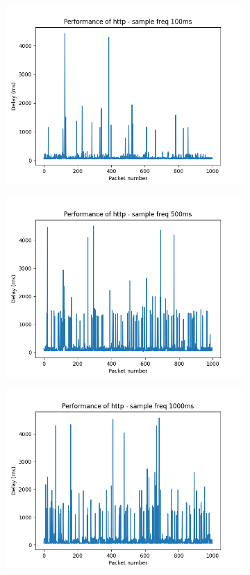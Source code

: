 \documentclass[]{article}
\begin{document}
\begin{figure}[h]
	\begin{subfigure}{0.5\textwidth}
		\includegraphics[width=0.9 \linewidth]{../performance_eval/protocols/fig/http_100ms}
		\caption{}
		\label{fig:http100ms}
	\end{subfigure}
	\begin{subfigure}{0.5\textwidth}
		\includegraphics[width=0.9\linewidth]{../performance_eval/protocols/fig/http_500ms}
		\caption{}
		\label{fig:http500ms}
	\end{subfigure}	
	\begin{subfigure}{0.5\textwidth}
		\includegraphics[width=0.9\linewidth]{../performance_eval/protocols/fig/http_1000ms}

\end{subfigure}
\end{figure}
\end{document}

